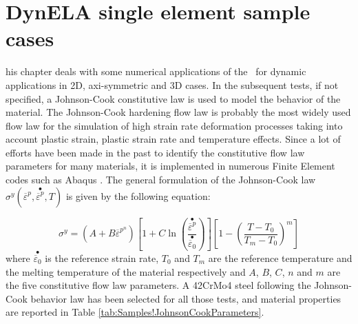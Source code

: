 %
%
%
\chapter{DynELA single element sample cases}

\startcontents[chapters]
\printmyminitoc[1]his chapter deals with some numerical applications of
the \DynELA~for dynamic applications in 2D, axi-symmetric and 3D
cases. In the subsequent tests, if not specified, a Johnson-Cook constitutive
law is used to model the behavior of the material. The Johnson-Cook
hardening flow law is probably the most widely used flow law for the
simulation of high strain rate deformation processes taking into account
plastic strain, plastic strain rate and temperature effects. Since
a lot of efforts have been made in the past to identify the constitutive
flow law parameters for many materials, it is implemented in numerous
Finite Element codes such as Abaqus \cite{abaqus20146}. The general
formulation of the Johnson-Cook law $\sigma^{y}(\overline{\varepsilon}^{p},\stackrel{\bullet}{\overline{\varepsilon}^{p}},T)$
is given by the following equation:

\begin{equation}
\sigma^{y}=\left(A+B\overline{\varepsilon}^{p^{n}}\right)\left[1+C\ln\left(\frac{\stackrel{\bullet}{\overline{\varepsilon}^{p}}}{\stackrel{\bullet}{\overline{\varepsilon}_{0}}}\right)\right]\left[1-\left(\frac{T-T_{0}}{T_{m}-T_{0}}\right)^{m}\right]\label{eq:Samples!Johnson-Cook}
\end{equation}
where $\stackrel{\bullet}{\overline{\varepsilon}_{0}}$ is the reference
strain rate, $T_{0}$ and $T_{m}$ are the reference temperature and
the melting temperature of the material respectively and $A$, $B$,
$C$, $n$ and $m$ are the five constitutive flow law parameters.
A 42CrMo4 steel following the Johnson-Cook behavior law has been selected
for all those tests, and material properties are reported in Table
\ref{tab:Samples!JohnsonCookParameters}.


